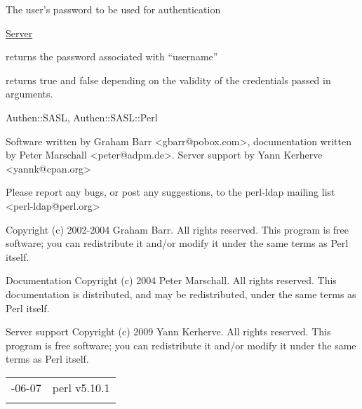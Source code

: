 \documentclass[]{article}
\renewcommand{\emph}[1]{\underline{#1}}
\begin{document}
\begin{description}
\itemsep1pt\parskip0pt
\item[pass]
The user's password to be used for authentication
\end{description}

\emph{Server}

\begin{description}
\itemsep1pt\parskip0pt
\item[getsecret(username)]
returns the password associated with ``username''
\end{description}

\begin{description}
\itemsep1pt\parskip0pt
\item[checkpass(username, password)]
returns true and false depending on the validity of the credentials
passed in arguments.
\end{description}


Authen::SASL, Authen::SASL::Perl


Software written by Graham Barr
\textless{}gbarr@pobox.com\textgreater{}, documentation written by Peter
Marschall \textless{}peter@adpm.de\textgreater{}. Server support by Yann
Kerherve \textless{}yannk@cpan.org\textgreater{}

Please report any bugs, or post any suggestions, to the perl-ldap
mailing list \textless{}perl-ldap@perl.org\textgreater{}


Copyright (c) 2002-2004 Graham Barr. All rights reserved. This program
is free software; you can redistribute it and/or modify it under the
same terms as Perl itself.

Documentation Copyright (c) 2004 Peter Marschall. All rights reserved.
This documentation is distributed, and may be redistributed, under the
same terms as Perl itself.

Server support Copyright (c) 2009 Yann Kerherve. All rights reserved.
This program is free software; you can redistribute it and/or modify it
under the same terms as Perl itself.

\begin{longtable}[c]{@{}ll@{}}
\toprule\addlinespace
2010-06-07 & perl v5.10.1
\\\addlinespace
\bottomrule
\end{longtable}
\end{document}
